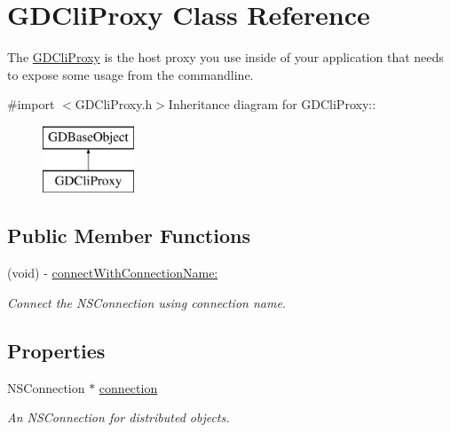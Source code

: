 \hypertarget{interface_g_d_cli_proxy}{
\section{GDCliProxy Class Reference}
\label{interface_g_d_cli_proxy}
}


The \hyperlink{interface_g_d_cli_proxy}{GDCliProxy} is the host proxy you use inside of your application that needs to expose some usage from the commandline.  


{\ttfamily \#import $<$GDCliProxy.h$>$}Inheritance diagram for GDCliProxy::\begin{figure}[H]
\begin{center}
\leavevmode
\includegraphics[height=2cm]{interface_g_d_cli_proxy}
\end{center}
\end{figure}
\subsection*{Public Member Functions}
\begin{DoxyCompactItemize}
\item 
(void) -\/ \hyperlink{interface_g_d_cli_proxy_a85ab4f8aa2ea3b04acde87809e2b3c96}{connectWithConnectionName:}
\begin{DoxyCompactList}\small\item\em Connect the NSConnection using connection name. \item\end{DoxyCompactList}\end{DoxyCompactItemize}
\subsection*{Properties}
\begin{DoxyCompactItemize}
\item 
\hypertarget{interface_g_d_cli_proxy_a6ba18cd87de0edbe5e3226b6d09626a1}{
NSConnection $\ast$ \hyperlink{interface_g_d_cli_proxy_a6ba18cd87de0edbe5e3226b6d09626a1}{connection}}
\label{interface_g_d_cli_proxy_a6ba18cd87de0edbe5e3226b6d09626a1}

\begin{DoxyCompactList}\small\item\em An NSConnection for distributed objects. \item\end{DoxyCompactList}\end{DoxyCompactItemize}


